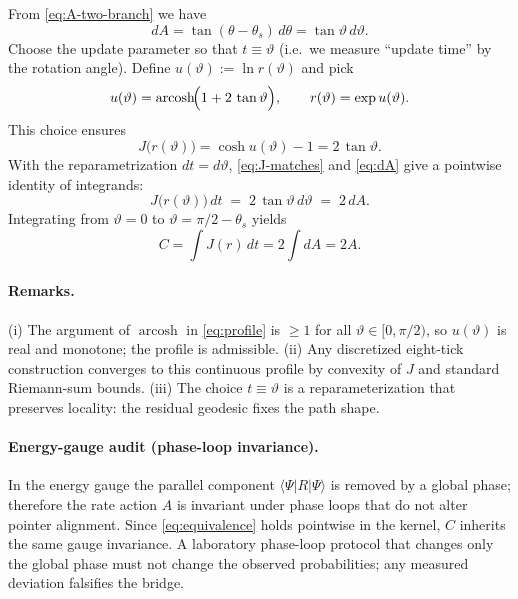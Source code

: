 \documentclass[11pt,letterpaper]{article}
\theoremstyle{definition}
\begin{document}
From \eqref{eq:A-two-branch} we have
\begin{equation}
dA=\tan(\theta-\theta_s)\,d\theta=\tan\vartheta\,d\vartheta.
\label{eq:dA}
\end{equation}
Choose the update parameter so that \(t\equiv\vartheta\) (i.e.\ we measure ``update time'' by the rotation angle). Define \(u(\vartheta):=\ln r(\vartheta)\) and pick
\begin{equation}
u(\vartheta)=\operatorname{arcosh}\!\Bigl(1+2\,\tan\vartheta\Bigr),
\qquad
r(\vartheta)=\exp u(\vartheta).
\label{eq:profile}
\end{equation}
This choice ensures
\begin{equation}
J\!\bigl(r(\vartheta)\bigr)=\cosh u(\vartheta)-1=2\,\tan\vartheta.
\label{eq:J-matches}
\end{equation}
With the reparametrization \(dt=d\vartheta\), \eqref{eq:J-matches} and \eqref{eq:dA} give a pointwise identity of integrands:
\begin{equation}
J\!\bigl(r(\vartheta)\bigr)\,dt\;=\;2\,\tan\vartheta\,d\vartheta\;=\;2\,dA.
\label{eq:pointwise-match}
\end{equation}
Integrating from \(\vartheta=0\) to \(\vartheta=\pi/2-\theta_s\) yields
\begin{equation}
C=\int J(r)\,dt
=2\int dA
=2A.
\label{eq:C-equals-2A}
\end{equation}

\paragraph{Remarks.}
(i) The argument of \(\operatorname{arcosh}\) in \eqref{eq:profile} is \(\ge 1\) for all \(\vartheta\in[0,\pi/2)\), so \(u(\vartheta)\) is real and monotone; the profile is admissible. (ii) Any discretized eight-tick construction converges to this continuous profile by convexity of \(J\) and standard Riemann-sum bounds. (iii) The choice \(t\equiv\vartheta\) is a reparameterization that preserves locality: the residual geodesic fixes the path shape.

\paragraph{Energy-gauge audit (phase-loop invariance).}
In the energy gauge the parallel component $\langle\Psi|R|\Psi\rangle$ is removed by a global phase; therefore the rate action $A$ is invariant under phase loops that do not alter pointer alignment. Since \eqref{eq:equivalence} holds pointwise in the kernel, $C$ inherits the same gauge invariance. A laboratory phase-loop protocol that changes only the global phase must not change the observed probabilities; any measured deviation falsifies the bridge.
\end{document}
